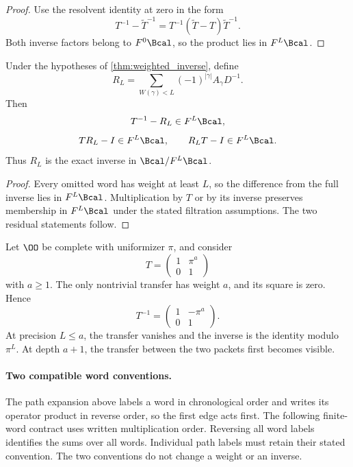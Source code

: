 \begin{proof}
Use the resolvent identity at zero in the form
\[
T^{-1}-\widetilde T^{-1}
=
T^{-1}(\widetilde T-T)\widetilde T^{-1}.
\]
Both inverse factors belong to $F^0\Bcal$, so the product lies in $F^L\Bcal$.
\end{proof}

\begin{corollary}\label{cor:finite_precision}
Under the hypotheses of \cref{thm:weighted_inverse}, define
\[
R_L
=
\sum_{W(\gamma)<L}(-1)^{|\gamma|}A_\gamma D^{-1}.
\]
Then
\[
T^{-1}-R_L\in F^L\Bcal,
\]
\[
TR_L-I\in F^L\Bcal,
\qquad
R_LT-I\in F^L\Bcal.
\]
Thus $R_L$ is the exact inverse in $\Bcal/F^L\Bcal$.
\end{corollary}

\begin{proof}
Every omitted word has weight at least $L$, so the difference from the full inverse lies in $F^L\Bcal$.  Multiplication by $T$ or by its inverse preserves membership in $F^L\Bcal$ under the stated filtration assumptions.  The two residual statements follow.
\end{proof}

\begin{example}\label{ex:triangular_transfer}
Let $\OO$ be complete with uniformizer $\pi$, and consider
\[
T=
\begin{pmatrix}
1&\pi^a\\
0&1
\end{pmatrix}
\]
with $a\geq1$.  The only nontrivial transfer has weight $a$, and its square is zero.  Hence
\[
T^{-1}
=
\begin{pmatrix}
1&-\pi^a\\
0&1
\end{pmatrix}.
\]
At precision $L\leq a$, the transfer vanishes and the inverse is the identity modulo $\pi^L$.  At depth $a+1$, the transfer between the two packets first becomes visible.
\end{example}

\paragraph{Two compatible word conventions.} The path expansion above labels a word in chronological order and writes its operator product in reverse order, so the first edge acts first.  The following finite-word contract uses written multiplication order.  Reversing all word labels identifies the sums over all words. Individual path labels must retain their stated convention.  The two conventions do not change a weight or an inverse.

